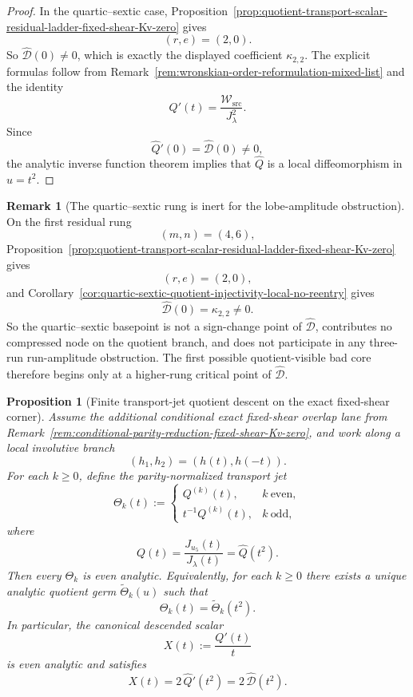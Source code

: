 \documentclass[11pt,a4paper]{amsart}
\theoremstyle{plain}
\newtheorem{proposition}[theorem]{Proposition}
\theoremstyle{definition}
\newtheorem{remark}[theorem]{Remark}
\begin{document}
\begin{proof}
In the quartic--sextic case, Proposition~\ref{prop:quotient-transport-scalar-residual-ladder-fixed-shear-Kv-zero}
gives
\[
(r,e)=(2,0).
\]
So $\widehat{\mathcal D}(0)\neq 0$, which is exactly the displayed coefficient
$\kappa_{2,2}$. The explicit formulas follow from
Remark~\ref{rem:wronskian-order-reformulation-mixed-list} and the identity
\[
Q'(t)=\frac{\mathcal W_{\mathrm{src}}}{J_\lambda^2}.
\]
Since
\[
\widehat Q'(0)=\widehat{\mathcal D}(0)\neq 0,
\]
the analytic inverse function theorem implies that $\widehat Q$ is a local
diffeomorphism in $u=t^2$.
\end{proof}

\begin{remark}[The quartic--sextic rung is inert for the lobe-amplitude obstruction]
\label{rem:quartic-sextic-inert-for-lobe-amplitude-obstruction}
On the first residual rung
\[
(m,n)=(4,6),
\]
Proposition~\ref{prop:quotient-transport-scalar-residual-ladder-fixed-shear-Kv-zero}
gives
\[
(r,e)=(2,0),
\]
and
Corollary~\ref{cor:quartic-sextic-quotient-injectivity-local-no-reentry}
gives
\[
\widehat{\mathcal D}(0)=\kappa_{2,2}\neq 0.
\]
So the quartic--sextic basepoint is not a sign-change point of
$\widehat{\mathcal D}$, contributes no compressed node on the quotient branch,
and does not participate in any three-run run-amplitude obstruction. The first
possible
quotient-visible bad core therefore begins only at a higher-rung critical point
of $\widehat{\mathcal D}$.
\end{remark}

\begin{proposition}[Finite transport-jet quotient descent on the exact fixed-shear corner]
\label{prop:finite-transport-jet-quotient-descent-fixed-shear-corner}
Assume the additional conditional exact fixed-shear overlap lane from
Remark~\ref{rem:conditional-parity-reduction-fixed-shear-Kv-zero}, and work
along a local involutive branch
\[
(h_1,h_2)=(h(t),h(-t)).
\]
For each $k\ge 0$, define the parity-normalized transport jet
\[
\Theta_k(t):=
\begin{cases}
Q^{(k)}(t),& k\ \text{even},\\[4pt]
t^{-1}Q^{(k)}(t),& k\ \text{odd},
\end{cases}
\]
where
\[
Q(t)=\frac{J_{u_5}(t)}{J_\lambda(t)}=\widehat Q(t^2).
\]
Then every $\Theta_k$ is even analytic. Equivalently, for each $k\ge 0$
there exists a unique analytic quotient germ $\widetilde\Theta_k(u)$ such that
\[
\Theta_k(t)=\widetilde\Theta_k(t^2).
\]
In particular, the canonical descended scalar
\[
X(t):=\frac{Q'(t)}{t}
\]
is even analytic and satisfies
\[
X(t)=2\,\widehat Q'(t^2)=2\,\widehat{\mathcal D}(t^2).
\]
\end{proposition}
\end{document}
